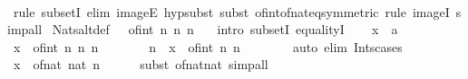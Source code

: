 \begin{isabellebody}
\ \ \isamarkupfalse%
\ {\isacharparenleft}{\kern0pt}rule\ subsetI{\isacharcomma}{\kern0pt}\ elim\ imageE{\isacharcomma}{\kern0pt}\ hypsubst{\isacharcomma}{\kern0pt}\ subst\ of{\isacharunderscore}{\kern0pt}int{\isacharunderscore}{\kern0pt}of{\isacharunderscore}{\kern0pt}nat{\isacharunderscore}{\kern0pt}eq{\isacharbrackleft}{\kern0pt}symmetric{\isacharbrackright}{\kern0pt}{\isacharcomma}{\kern0pt}\ rule\ imageI{\isacharparenright}{\kern0pt}\ simp{\isacharunderscore}{\kern0pt}all%
\endisatagproof
{\isafoldproof}%
%
\isadelimproof
\isanewline
%
\endisadelimproof
\isanewline
{}\isamarkupfalse%
\ Nats{\isacharunderscore}{\kern0pt}altdef{}{\isacharcolon}{\kern0pt}\ {\isachardoublequoteopen}{\isasymnat}\ {\isacharequal}{\kern0pt}\ {\isacharbraceleft}{\kern0pt}of{\isacharunderscore}{\kern0pt}int\ n\ {\isacharbar}{\kern0pt}n{\isachardot}{\kern0pt}\ n\ {\isasymge}\ {}{\isacharbraceright}{\kern0pt}{\isachardoublequoteclose}\isanewline
%
\isadelimproof
%
\endisadelimproof
%
\isatagproof
{}\isamarkupfalse%
\ {\isacharparenleft}{\kern0pt}intro\ subsetI\ equalityI{\isacharparenright}{\kern0pt}\isanewline
\ \ \isamarkupfalse%
\ x\ {\isacharcolon}{\kern0pt}{\isacharcolon}{\kern0pt}\ {\isacharprime}{\kern0pt}a\isanewline
\ \ \isamarkupfalse%
\ {\isachardoublequoteopen}x\ {\isasymin}\ {\isacharbraceleft}{\kern0pt}of{\isacharunderscore}{\kern0pt}int\ n\ {\isacharbar}{\kern0pt}n{\isachardot}{\kern0pt}\ n\ {\isasymge}\ {}{\isacharbraceright}{\kern0pt}{\isachardoublequoteclose}\isanewline
\ \ \isamarkupfalse%
\ \isamarkupfalse%
\ n\ \ {\isachardoublequoteopen}x\ {\isacharequal}{\kern0pt}\ of{\isacharunderscore}{\kern0pt}int\ n{\isachardoublequoteclose}\ {\isachardoublequoteopen}n\ {\isasymge}\ {}{\isachardoublequoteclose}\isanewline
\ \ \ \ \isamarkupfalse%
\ {\isacharparenleft}{\kern0pt}auto\ elim{\isacharbang}{\kern0pt}{\isacharcolon}{\kern0pt}\ Ints{\isacharunderscore}{\kern0pt}cases{\isacharparenright}{\kern0pt}\isanewline
\ \ \isamarkupfalse%
\ \isamarkupfalse%
\ {\isachardoublequoteopen}x\ {\isacharequal}{\kern0pt}\ of{\isacharunderscore}{\kern0pt}nat\ {\isacharparenleft}{\kern0pt}nat\ n{\isacharparenright}{\kern0pt}{\isachardoublequoteclose}\isanewline
\ \ \ \ \isamarkupfalse%
\ {\isacharparenleft}{\kern0pt}subst\ of{\isacharunderscore}{\kern0pt}nat{\isacharunderscore}{\kern0pt}nat{\isacharparenright}{\kern0pt}\ simp{\isacharunderscore}{\kern0pt}all\isanewline

\end{isabellebody}
